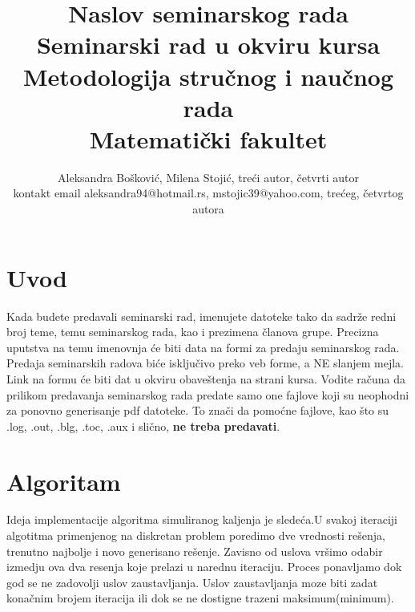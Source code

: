 \documentclass[a4paper]{article}
\begin{document}
\title{Naslov seminarskog rada\\ \small{Seminarski rad u okviru kursa\\Metodologija stručnog i naučnog rada\\ Matematički fakultet}}

\author{Aleksandra Bošković, Milena Stojić, treći autor, četvrti autor\\ kontakt email aleksandra94@hotmail.rs, mstojic39@yahoo.com, trećeg, četvrtog autora}


\maketitle


\tableofcontents

\newpage

\section{Uvod}
\label{sec:uvod}

Kada budete predavali seminarski rad, imenujete datoteke tako da sadrže redni broj teme, temu seminarskog rada, kao i prezimena članova grupe. Precizna uputstva na temu imenovnja će biti data na formi za predaju seminarskog rada. Predaja seminarskih radova biće isključivo preko veb forme, a NE slanjem mejla. Link na formu će biti dat u okviru obaveštenja na strani kursa. Vodite računa da prilikom predavanja seminarskog rada predate samo one fajlove koji su neophodni za ponovno generisanje pdf datoteke. To znači da pomoćne fajlove, kao što su .log, .out, .blg, .toc, .aux i slično, \textbf{ne treba predavati}.


\section{Algoritam}
Ideja implementacije algoritma simuliranog kaljenja je sledeća.U svakoj iteraciji algotitma primenjenog na diskretan problem poredimo dve vrednosti rešenja, trenutno najbolje i novo generisano rešenje. Zavisno od uslova vršimo odabir izmedju ova dva resenja koje prelazi u narednu iteraciju. Proces ponavljamo  dok god se ne zadovolji uslov zaustavljanja. Uslov zaustavljanja moze biti zadat konačnim brojem iteracija ili dok se ne dostigne trazeni maksimum(minimum).
\end{document}
